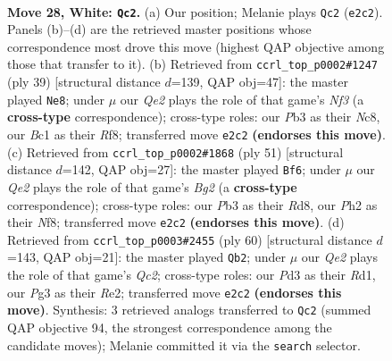 \documentclass[11pt]{article}
\begin{document}
\clearpage

\begin{figure}[p]\centering
\begin{subfigure}{0.46\textwidth}\centering
\resizebox{\linewidth}{!}{%
\newchessgame
\chessboard[
  setfen={2rq2r1/4bp1k/2n2n2/p6p/1p1p2p1/1P1P2P1/PR2QP1P/RNB1N1K1 w - - 12 28},
  showmover=false,
  pgfstyle=straightmove, color=movearrow, markmove={e2-c2}
]}
\caption{}
\end{subfigure}\hfill
\begin{subfigure}{0.46\textwidth}\centering
\resizebox{\linewidth}{!}{%
\newchessgame
\chessboard[
  setfen={2n2r1k/3q1pbp/rp1p1np1/2p1p3/P1P1P3/2NP1NP1/3B1P1P/1R1Q1RK1 b - - 3 20},
  showmover=false,
  pgfstyle=straightmove, color=movearrow, markmove={f6-e8}
]}
\caption{}
\end{subfigure}
\\[4pt]
\begin{subfigure}{0.46\textwidth}\centering
\resizebox{\linewidth}{!}{%
\newchessgame
\chessboard[
  setfen={2rr1nk1/4qpb1/pp1pp1p1/7p/PnP1PP2/1PN2Q1P/4B1P1/1R1RB2K b - - 3 26},
  showmover=false,
  pgfstyle=straightmove, color=movearrow, markmove={g7-f6}
]}
\caption{}
\end{subfigure}\hfill
\begin{subfigure}{0.46\textwidth}\centering
\resizebox{\linewidth}{!}{%
\newchessgame
\chessboard[
  setfen={3qr1k1/1p2r1pp/2pnpn2/p2p4/3P4/1P1NP1PP/P1Q1RPB1/3R2K1 w - - 11 31},
  showmover=false,
  pgfstyle=straightmove, color=movearrow, markmove={c2-b2}
]}
\caption{}
\end{subfigure}
\caption{\textbf{Move 28, White: \texttt{Qc2}.} (a) Our position; Melanie plays \texttt{Qc2} (\texttt{e2c2}). Panels (b)--(d) are the retrieved master positions whose correspondence most drove this move (highest QAP objective among those that transfer to it). (b) Retrieved from \texttt{ccrl\_top\_p0002\#1247} (ply 39) [structural distance $d$=139, QAP obj=47]: the master played \texttt{Ne8}; under $\mu$ our \emph{Qe2} plays the role of that game's \emph{Nf3} (a \textbf{cross-type} correspondence); cross-type roles: our \emph{P}b3 as their \emph{N}c8, our \emph{B}c1 as their \emph{R}f8; transferred move \texttt{e2c2} \textbf{(endorses this move)}. (c) Retrieved from \texttt{ccrl\_top\_p0002\#1868} (ply 51) [structural distance $d$=142, QAP obj=27]: the master played \texttt{Bf6}; under $\mu$ our \emph{Qe2} plays the role of that game's \emph{Bg2} (a \textbf{cross-type} correspondence); cross-type roles: our \emph{P}b3 as their \emph{R}d8, our \emph{P}h2 as their \emph{N}f8; transferred move \texttt{e2c2} \textbf{(endorses this move)}. (d) Retrieved from \texttt{ccrl\_top\_p0003\#2455} (ply 60) [structural distance $d$=143, QAP obj=21]: the master played \texttt{Qb2}; under $\mu$ our \emph{Qe2} plays the role of that game's \emph{Qc2}; cross-type roles: our \emph{P}d3 as their \emph{R}d1, our \emph{P}g3 as their \emph{R}e2; transferred move \texttt{e2c2} \textbf{(endorses this move)}. Synthesis: 3 retrieved analogs transferred to \texttt{Qc2} (summed QAP objective 94, the strongest correspondence among the candidate moves); Melanie committed it via the \texttt{search} selector.}
\label{fig:thought-m54}
\end{figure}
\end{document}
